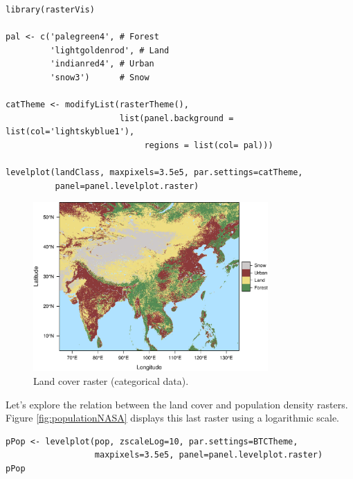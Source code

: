 
\lstset{language=R}
\begin{lstlisting}
library(rasterVis)

pal <- c('palegreen4', # Forest
         'lightgoldenrod', # Land
         'indianred4', # Urban
         'snow3')      # Snow

catTheme <- modifyList(rasterTheme(),
                       list(panel.background = list(col='lightskyblue1'),
                            regions = list(col= pal)))

levelplot(landClass, maxpixels=3.5e5, par.settings=catTheme,
          panel=panel.levelplot.raster)
\end{lstlisting}

\begin{figure}[h!]
\centering
\includegraphics[width=0.8\textwidth]{figs/landClass.pdf}
\caption{\label{fig:landClass}Land cover raster (categorical data).}
\end{figure}

Let's explore the relation between the land cover and population
density rasters. Figure \ref{fig:populationNASA} displays this
last raster using a logarithmic scale.


\lstset{language=R}
\begin{lstlisting}
pPop <- levelplot(pop, zscaleLog=10, par.settings=BTCTheme,
                  maxpixels=3.5e5, panel=panel.levelplot.raster)
pPop
\end{lstlisting}


